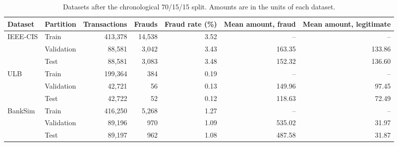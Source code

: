 \begin{table}[t]
\centering
\caption{Datasets after the chronological 70/15/15 split. Amounts are in the units of each dataset.}
\label{tab:data}
\begin{tabular}{llrrrrr}
\toprule
Dataset & Partition & Transactions & Frauds & Fraud rate (\%) & Mean amount, fraud & Mean amount, legitimate \\
\midrule
IEEE-CIS & Train & 413,378 & 14,538 & 3.52 & -- & -- \\
 & Validation & 88,581 & 3,042 & 3.43 & 163.35 & 133.86 \\
 & Test & 88,581 & 3,083 & 3.48 & 152.32 & 136.60 \\
ULB & Train & 199,364 & 384 & 0.19 & -- & -- \\
 & Validation & 42,721 & 56 & 0.13 & 149.96 & 97.45 \\
 & Test & 42,722 & 52 & 0.12 & 118.63 & 72.49 \\
BankSim & Train & 416,250 & 5,268 & 1.27 & -- & -- \\
 & Validation & 89,196 & 970 & 1.09 & 535.02 & 31.97 \\
 & Test & 89,197 & 962 & 1.08 & 487.58 & 31.87 \\
\bottomrule
\end{tabular}
\end{table}
